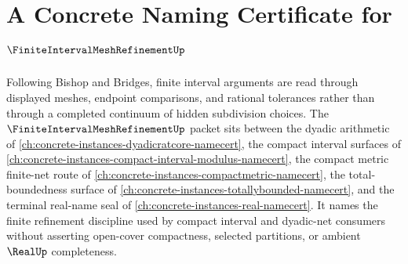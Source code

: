 \chapter{A Concrete Naming Certificate for $\FiniteIntervalMeshRefinementUp$}
\label{ch:concrete-instances-finite-interval-mesh-refinement-namecert}

Following Bishop and Bridges, finite interval arguments are read through displayed meshes, endpoint comparisons, and rational tolerances rather than through a completed continuum of hidden subdivision choices. The $\FiniteIntervalMeshRefinementUp$ packet sits between the dyadic arithmetic of \autoref{ch:concrete-instances-dyadicratcore-namecert}, the compact interval surfaces of \autoref{ch:concrete-instances-compact-interval-modulus-namecert}, the compact metric finite-net route of \autoref{ch:concrete-instances-compactmetric-namecert}, the total-boundedness surface of \autoref{ch:concrete-instances-totallybounded-namecert}, and the terminal real-name seal of \autoref{ch:concrete-instances-real-namecert}. It names the finite refinement discipline used by compact interval and dyadic-net consumers without asserting open-cover compactness, selected partitions, or ambient $\RealUp$ completeness.

